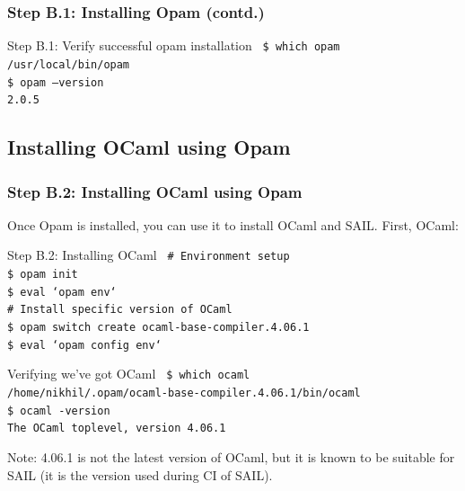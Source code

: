 \documentclass[aspectratio=169]{beamer}
\newcommand{\hm}{\hspace*{1em}}
\newcommand{\scripttt}{\scriptsize\tt}
\begin{document}
\begin{frame}
  \frametitle{Step B.1: Installing Opam (contd.)}

  \begin{block}{Step B.1: Verify successful opam installation}
    {\scripttt
      \hm{}\$ which opam \\
      \hm{}/usr/local/bin/opam \\
      \hm{}\$ opam --version \\
      \hm{}2.0.5 }
  \end{block}

\end{frame}


\subsection{Installing OCaml using Opam}

\begin{frame}
  \frametitle{Step B.2: Installing OCaml using Opam}

  {\scriptsize Once Opam is installed, you can use it to install OCaml and SAIL.  First, OCaml:}

  \begin{block}{Step B.2: Installing OCaml}
    {\scripttt
      \hm{}\# Environment setup \\
      \hm{}\$ opam init \\
      \hm{}\$ eval `opam env` \\
      \hm{}\# Install specific version of OCaml \\
      \hm{}\$ opam switch create ocaml-base-compiler.4.06.1 \\
      \hm{}\$ eval `opam config env`
    }
  \end{block}

  \begin{block}{Verifying we've got OCaml}
    {\scripttt
      \hm{}\$ which ocaml \\
      \hm{}/home/nikhil/.opam/ocaml-base-compiler.4.06.1/bin/ocaml \\
      \hm{}\$ ocaml -version \\
      \hm{}The OCaml toplevel, version 4.06.1
    }
  \end{block}

  {\tiny Note: 4.06.1 is not the latest version of OCaml,
    but it is known to be suitable for SAIL (it is the version used during CI of SAIL).}

\end{frame}
\end{document}
